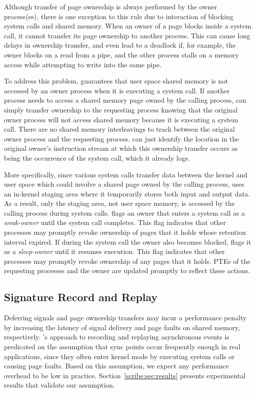 \begin{table}[]
Although transfer of page ownership is always performed by the owner
process(es), there is one exception to this rule due to interaction of
blocking system calls and shared memory.  When an owner of a page
blocks inside a system call, it cannot transfer its page
ownership to another process.  This can cause long delays in
ownership transfer, and
even lead to a deadlock if, for
example, the owner blocks on a read from a pipe, and the other process
stalls on a memory access while attempting to write into the same
pipe.

To address this problem, \scribe{} guarantees that user space
shared memory is not accessed by an owner process when it is executing
a system call.  If another process needs to access a shared memory
page owned by the calling process, \scribe{} can simply transfer
ownership to the requesting process knowing that the original owner
process will not access shared memory because it is executing a system
call.  There are no shared memory interleavings to track between the
original owner process and the requesting process.  \scribe{} can
just identify the location in the original owner's instruction stream
at which this ownership transfer occurs as being the occurrence of the
system call, which it already logs.

More specifically, since various system calls transfer data between
the kernel and user space which could involve a shared page owned by
the calling process, \scribe{} uses an in-kernel staging area where it
temporarily stores both input and output data.  As a result, only the
staging area, not user space memory, is accessed by the calling
process during system calls.  \scribe{} flags an owner that enters a 
system call as a {\em weak-owner} until the system call completes.
This flag indicates that other processes may promptly revoke ownership
of pages that it holds whose retention interval expired. If during the
system call the owner also becomes blocked, \scribe{} flags it as a
{\em sleep-owner} until it resumes execution. This flag indicates that
other processes may promptly revoke ownership of any pages that it
holds.  PTEs of the requesting processes and the owner are updated
promptly to reflect these actions.

\subsection{Signature Record and Replay}

Deferring signals and page ownership transfers may incur a performance
penalty by increasing the latency of signal delivery and page faults
on shared memory, respectively.  \scribe{}'s approach to recording and
replaying asynchronous events is predicated on the assumption that
sync points occur frequently enough in real applications, since they
often enter kernel mode by executing system calls or causing page
faults. Based on this assumption, we expect any performance overhead
to be low in practice.  Section~\ref{scribe:sec:results} presents
experimental results that validate our assumption.


\end{table}
